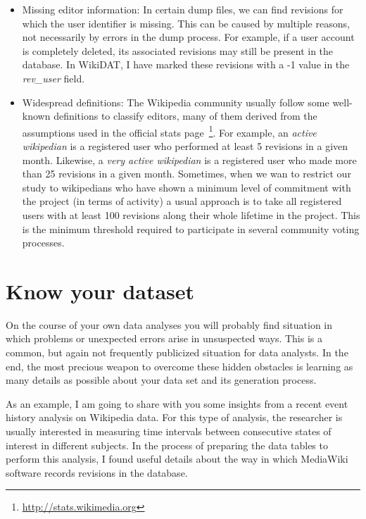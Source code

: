 \begin{itemize}
 \item Missing editor information: In certain dump files, we can find revisions
for which the user identifier is missing. This can be caused by multiple reasons,
not necessarily by errors in the dump process. For example, if a user account is
completely deleted, its associated revisions may still be present in the database.
In WikiDAT, I have marked these revisions with a -1 value in the \textit{rev\_user}
field.

 \item Widespread definitions: The Wikipedia community usually follow some well-known
definitions to classify editors, many of them derived from the assumptions used
in the official stats page~\footnote{\url{http://stats.wikimedia.org}}. For example,
an \textit{active wikipedian} is a registered user who performed at least 5 revisions
in a given month. Likewise, a \textit{very active wikipedian} is a registered user who
made more than 25 revisions in a given month. Sometimes, when we wan to restrict our
study to wikipedians who have shown a minimum level of commitment with the project
(in terms of activity) a usual approach is to take all registered users with at least
100 revisions along their whole lifetime in the project. This is the minimum threshold
required to participate in several community voting processes.

\end{itemize}


\section{Know your dataset}
On the course of your own data analyses you will probably find situation in which
problems or unexpected errors arise in unsuspected ways. This is a common, but
again not frequently publicized situation for data analysts. In the end, the most
precious weapon to overcome these hidden obstacles is learning as many details
as possible about your data set and its generation process.

As an example, I am going to share with you some insights from a recent event
history analysis on Wikipedia data. For this type of analysis, the researcher is
usually interested in measuring time intervals between consecutive states of interest
in different subjects. In the process of preparing the data tables to perform this
analysis, I found useful details about the way in which MediaWiki software records
revisions in the database.

